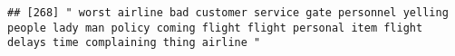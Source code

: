 \documentclass[
]{article}
\begin{document}
\begin{verbatim}
## [268] " worst airline bad customer service gate personnel yelling people lady man policy coming flight flight personal item flight delays time complaining thing airline "                                                                                                                                                                                                                                                                                                                                                                                                                                                                                                                                                                                                                                                                                                                                                                                                                                                                                                                                                                                                                                                                                                                                                                                                                                                                                                                                                                                                                                                                                                                                                                                                                            

\end{verbatim}
\end{document}
